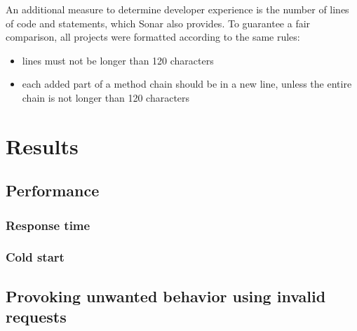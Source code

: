 \documentclass[a4paper]{article}
\begin{document}
\noindent An additional measure to determine developer experience is the number
of lines of code and statements, which Sonar also provides. To guarantee a fair
comparison, all projects were formatted according to the same rules:

\begin{itemize}
	\item lines must not be longer than 120 characters
	\item each added part of a method chain should be in a new line, unless
	      the entire chain is not longer than 120 characters
\end{itemize}

\section{Results}
\subsection{Performance}
\subsubsection{Response time}

\subsubsection{Cold start}

\subsection{Provoking unwanted behavior using invalid requests}
\end{document}
